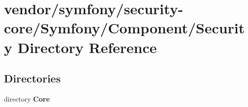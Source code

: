\section{vendor/symfony/security-\/core/\+Symfony/\+Component/\+Security Directory Reference}
\label{dir_fe3705c0c228721470e7cdfa6ce630f2}
\subsection*{Directories}
\begin{DoxyCompactItemize}
\item 
directory {\bf Core}
\end{DoxyCompactItemize}
